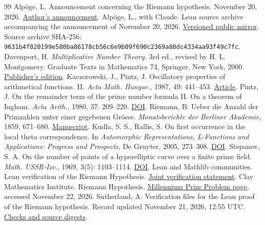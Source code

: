 \documentclass[UTF8,fontset=none,a4paper,11pt]{ctexart}
\theoremstyle{definition}
\begin{document}
\begingroup
\small
\begin{thebibliography}{99}
\setlength{\itemsep}{1.5pt}
 Alpöge, L. Announcement concerning the Riemann hypothesis. November 20, 2026. \href{https://alpo.ge/remark.pdf}{Author's announcement}.
 Alpöge, L., with Claude. Lean source archive accompanying the announcement of November 20, 2026. \href{https://github.com/leanprover-community/riemann-hypothesis/tree/23aebbb302010b292314d406aa97f7901d698634/src}{Versioned public mirror}. Source archive SHA-256: \texttt{9631b4f020199e58}\allowbreak\texttt{0ba86178cb56c6e9}\allowbreak\texttt{b09f690c2369a80d}\allowbreak\texttt{c4334aa93f49c7fc}.
 Davenport, H. \emph{Multiplicative Number Theory}. 3rd ed., revised by H. L. Montgomery. Graduate Texts in Mathematics 74, Springer, New York, 2000. \href{https://link.springer.com/book/9780387950976}{Publisher's edition}.
 Kaczorowski, J., Pintz, J. Oscillatory properties of arithmetical functions. II. \emph{Acta Math. Hungar.}, 1987, 49: 441--453. \href{https://personal.math.ubc.ca/~gerg/teaching/592-Fall2018/papers/1987.Kaczorowski_2.pdf}{Article}.
 Pintz, J. On the remainder term of the prime number formula II. On a theorem of Ingham. \emph{Acta Arith.}, 1980, 37: 209--220. \href{https://doi.org/10.4064/aa-37-1-209-220}{DOI}.
 Riemann, B. Ueber die Anzahl der Primzahlen unter einer gegebenen Grösse. \emph{Monatsberichte der Berliner Akademie}, 1859, 671--680. \href{https://www.claymath.org/collections/riemanns-1859-manuscript/}{Manuscript}.
 Kudla, S. S., Rallis, S. On first occurrence in the local theta correspondence. In \emph{Automorphic Representations, L-Functions and Applications: Progress and Prospects}, De Gruyter, 2005, 273--308. \href{https://doi.org/10.1515/9783110892703.273}{DOI}.
 Stepanov, S. A. On the number of points of a hyperelliptic curve over a finite prime field. \emph{Math. USSR-Izv.}, 1969, 3(5): 1103--1114. \href{https://doi.org/10.1070/IM1969v003n05ABEH000834}{DOI}.
 Lean and Mathlib communities. Lean verification of the Riemann Hypothesis. \href{https://leanprover-community.github.io/blog/posts/riemann-hypothesis/}{Joint verification statement}.
 Clay Mathematics Institute. Riemann Hypothesis. \href{https://www.claymath.org/millennium/riemann-hypothesis/}{Millennium Prize Problem page}, accessed November 22, 2026.
 Sutherland, A. Verification files for the Lean proof of the Riemann hypothesis. Record updated November 21, 2026, 12:55 UTC. \href{https://math.mit.edu/~drew/grh/}{Checks and source digests}.
\end{thebibliography}
\endgroup
\end{document}
